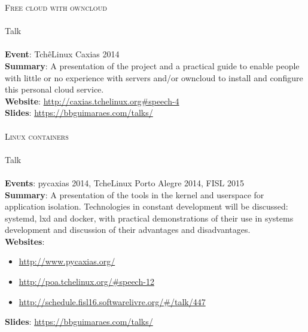 \noindent
\textsc{\Large Free cloud with owncloud} \\\\
Talk \\\\
\textbf{Event}: TchêLinux Caxias 2014 \\
\textbf{Summary}:
    A presentation of the project and a practical guide to enable people
    with little or no experience with servers and/or owncloud to install and
    configure this personal cloud service. \\
\textbf{Website}: \url{http://caxias.tchelinux.org#speech-4} \\
\textbf{Slides}: \url{https://bbguimaraes.com/talks/} \\\\

\noindent
\textsc{\Large Linux containers} \\\\
Talk \\\\
\textbf{Events}: pycaxias 2014, TcheLinux Porto Alegre 2014, FISL 2015 \\
\textbf{Summary}:
    A presentation of the tools in the kernel and userspace for application
    isolation. Technologies in constant development will be discussed: systemd,
    lxd and docker, with practical demonstrations of their use in systems
    development and discussion of their advantages and disadvantages. \\
\textbf{Websites}:
\begin{itemize}
    \vspace{-2.5mm}
    \itemsep-1mm
    \item \url{http://www.pycaxias.org/}
    \item \url{http://poa.tchelinux.org/#speech-12}
    \item \url{http://schedule.fisl16.softwarelivre.org/#/talk/447}
    \vspace{-2.5mm}
\end{itemize}
\textbf{Slides}: \url{https://bbguimaraes.com/talks/} \\\\

